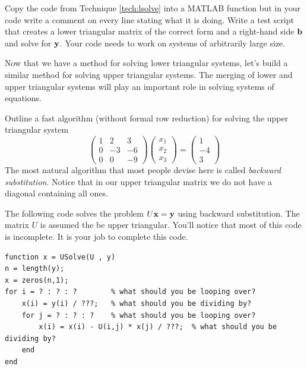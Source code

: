 \begin{problem}
    Copy the code from Technique \ref{tech:lsolve} into a MATLAB function but in your code
    write a comment on every line stating what it is doing.  Write a test script that
    creates a lower triangular matrix of the correct form and a right-hand side ${\bf b}$ and
    solve for ${\bf y}$.  Your code needs to work on systems of arbitrarily large size.
\end{problem}

Now that we have a method for solving lower triangular systems, let's build a similar
method for solving upper triangular systems.  The merging of lower and upper triangular
systems will play an important role in solving systems of equations.
\begin{problem}
    Outline a fast algorithm (without formal row reduction) for solving the upper triangular system
    \[ \begin{pmatrix} 1 & 2 & 3 \\ 0 & -3 & -6 \\ 0 & 0 & -9 \end{pmatrix}
        \begin{pmatrix} x_1 \\ x_2 \\ x_3 \end{pmatrix} = \begin{pmatrix} 1 \\ -4 \\
        3\end{pmatrix} \]
    The most natural algorithm that most people devise here is called {\it backward
    substitution}.  Notice that in our upper triangular matrix we do not have a diagonal
    containing all ones. 
\end{problem}

\begin{technique}\label{tech:usolve}
    The following code solves the problem $U {\bf x} = {\bf y}$ using backward
    substitution.  The matrix $U$ is assumed the be upper triangular.  You'll notice that
    most of this code is incomplete.  It is your job to complete this code.
\begin{lstlisting}
function x = USolve(U , y)
n = length(y);
x = zeros(n,1);
for i = ? : ? : ?        % what should you be looping over?
    x(i) = y(i) / ???;   % what should you be dividing by?
    for j = ? : ? : ?    % what should you be looping over? 
        x(i) = x(i) - U(i,j) * x(j) / ???;  % what should you be dividing by?
    end
end
\end{lstlisting}
\end{technique}


